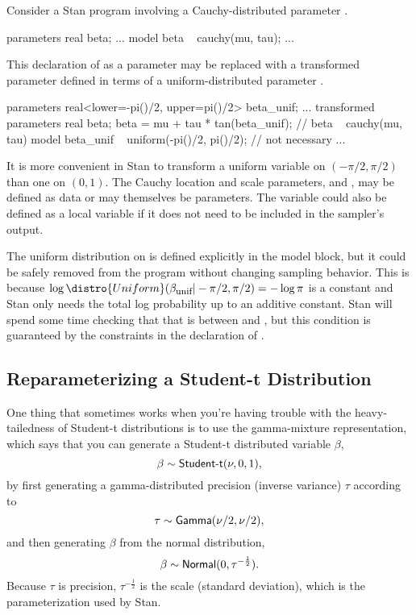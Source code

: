 Consider a Stan program involving a Cauchy-distributed parameter
.
%
\begin{stancode}
parameters {
  real beta;
  ...
}
model {
  beta ~ cauchy(mu, tau);
  ...
}
\end{stancode}
%
This declaration of  as a parameter may be replaced with a
transformed parameter  defined in terms of a
uniform-distributed parameter .
%
\begin{stancode}
parameters {
  real<lower=-pi()/2, upper=pi()/2> beta_unif;
  ...
}
transformed parameters {
  real beta;
  beta = mu + tau * tan(beta_unif);  // beta ~ cauchy(mu, tau)
}    
model {
  beta_unif ~ uniform(-pi()/2, pi()/2);  // not necessary
  ...
}
\end{stancode}
%
It is more convenient in Stan to transform a uniform variable on
$(-\pi/2, \pi/2)$ than one on $(0,1)$.  The Cauchy location and scale
parameters,  and , may be defined as data or may
themselves be parameters.  The variable  could also be
defined as a local variable if it does not need to be included in the
sampler's output.

The uniform distribution on  is defined explicitly in
the model block, but it could be safely removed from the program
without changing sampling behavior.  This is because $\log
\distro{Uniform}(\beta_{\mbox{\footnotesize unif}}|-\pi/2,\pi/2) =
-\log \pi$ is a constant and Stan only
needs the total log probability up to an additive constant.  Stan will spend
some time checking that that  is between
 and , but this condition is guaranteed by
the constraints in the declaration of .  

\subsection{Reparameterizing a Student-t Distribution}

One thing that sometimes works when you're having trouble with the
heavy-tailedness of Student-t distributions is to use the
gamma-mixture representation, which says that you can generate a
Student-t distributed variable $\beta$,
\[
\beta \sim \mbox{\sf Student-t}(\nu, 0, 1),
\]
by first generating a gamma-distributed precision (inverse variance)
$\tau$ according to
\[
\tau \sim \mbox{\sf Gamma}(\nu/2, \nu/2),
\]
and then generating $\beta$ from the normal distribution,
\[
\beta \sim \mbox{\sf Normal}(0,\tau^{-\frac{1}{2}}).
\]
%
Because $\tau$ is precision, $\tau^{-\frac{1}{2}}$ is the scale
(standard deviation), which is the parameterization used by Stan.

